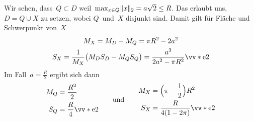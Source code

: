 \documentclass[../full]{subfiles}
\begin{document}
    Wir sehen, dass~\( Q \subset D \)
    weil~\( \max_{x \in Q} \lVert x\rVert_2 = a \sqrt{2} \leq R \).
    Das erlaubt uns, \( D = Q \cup X \) zu setzen,
    wobei \( Q \)~und~\( X \) disjunkt sind.
    Damit gilt f\"ur Fl\"ache und Schwerpunkt von~\( X \)
    \begin{gather*}
        M_X = M_D - M_Q
        = \pi R^2 - 2 a^2
        \\
        S_X = \frac{1}{M_X} \paren[\big]{M_D S_D - M_Q S_Q}
        = \frac{a^3}{2 a^2 - \pi R^2} \StandardVect{2}
    \end{gather*}
    Im Fall~\( a = \frac{R}{2} \) ergibt sich dann
    \begin{gather*}
        \begin{aligned}
            M_Q &= \frac{R^2}{2}
            \\
            S_Q &= \frac{R}{4} \StandardVect{2}
        \end{aligned}
        \qquad \text{und} \qquad
        \begin{aligned}
        M_X &= \paren[\Big]{\pi - \frac{1}{2}} R^2
        \\
        S_X &= \frac{R}{4 \paren{1 - 2 \pi}} \StandardVect{2}
        \end{aligned}
    \end{gather*}
\end{document}
